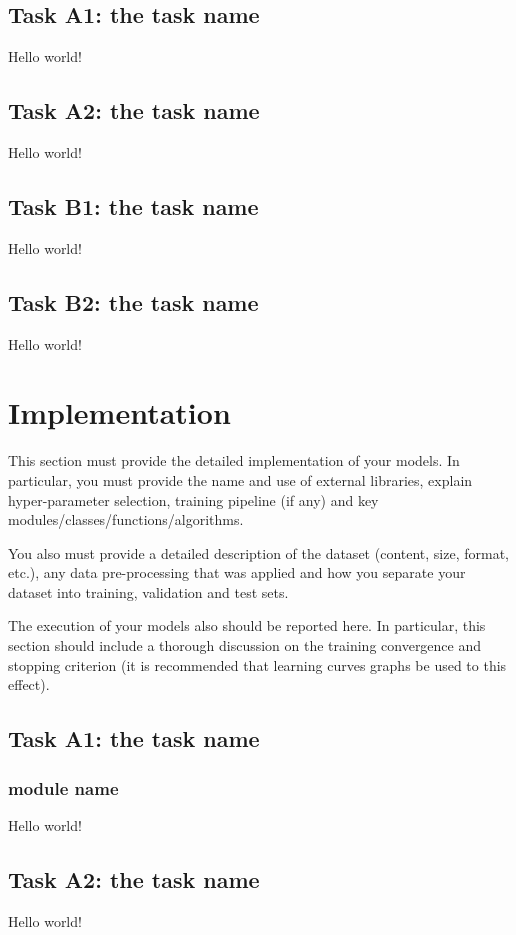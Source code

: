 \documentclass{article}
\begin{document}
    \subsection{Task A1: the task name}
    \label{ssec:models_A1}
    Hello world!
    \subsection{Task A2: the task name}
    \label{ssec:models_A1}
    Hello world!
    \subsection{Task B1: the task name}
    \label{ssec:models_A1}
    Hello world!
    \subsection{Task B2: the task name}
    \label{ssec:models_A1}
    Hello world!

\section{Implementation}
\label{sec:impl}
    This section must provide the detailed implementation of your models. In particular, you must provide the name and use of external libraries, explain hyper-parameter selection, training pipeline (if any) and key modules/classes/functions/algorithms.
    
    You also must provide a detailed description of the dataset (content, size, format, etc.), any data pre-processing that was applied and how you separate your dataset into training, validation and test sets.
    
    The execution of your models also should be reported here. In particular, this section should include a thorough discussion on the training convergence and stopping criterion (it is recommended that learning curves graphs be used to this effect).

    \subsection{Task A1: the task name}
    \label{ssec:models_A1}
    \subsubsection{module name}
    Hello world!
    \subsection{Task A2: the task name}
    \label{ssec:models_A1}
    Hello world!
\end{document}

